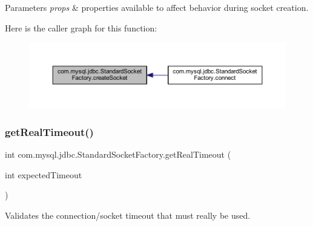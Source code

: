 \begin{DoxyParams}{Parameters}
{\em props} & properties available to affect behavior during socket creation. \\
\hline
\end{DoxyParams}
Here is the caller graph for this function\+:
\nopagebreak
\begin{figure}[H]
\begin{center}
\leavevmode
\includegraphics[width=350pt]{classcom_1_1mysql_1_1jdbc_1_1_standard_socket_factory_ac59fccd4861f3da102251a22ec119aeb_icgraph}
\end{center}
\end{figure}
\mbox{\label{classcom_1_1mysql_1_1jdbc_1_1_standard_socket_factory_ae455f41cfd47611b1f979ce4c2f7cbec}} 
\subsubsection{\texorpdfstring{get\+Real\+Timeout()}{getRealTimeout()}}
{\footnotesize\ttfamily int com.\+mysql.\+jdbc.\+Standard\+Socket\+Factory.\+get\+Real\+Timeout (\begin{DoxyParamCaption}\item[{int}]{expected\+Timeout }\end{DoxyParamCaption})\hspace{0.3cm}{\ttfamily [protected]}}

Validates the connection/socket timeout that must really be used.


